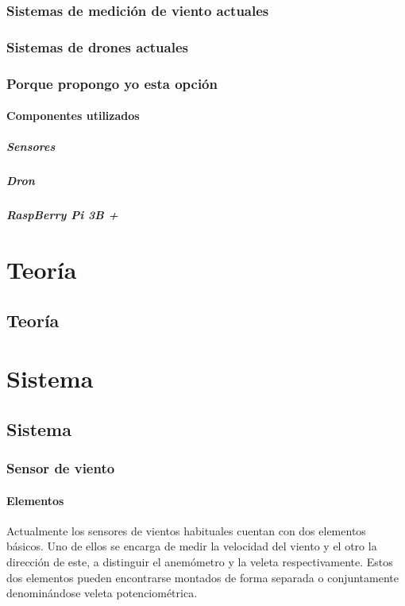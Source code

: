 \documentclass[spanish]{book}
\begin{document}
    \section{Sistemas de medición de viento actuales}
    \section{Sistemas de drones actuales}
    \section{Porque propongo yo esta opción}
        \subsection{Componentes utilizados}
        \subsubsection{Sensores}
        \subsubsection{Dron}
        \subsubsection{RaspBerry Pi 3B +}

\part{Teoría}
    \chapter{Teoría}
	
\part{Sistema}
    \chapter{Sistema}
        \section{Sensor de viento}
            \subsection{Elementos}
            Actualmente los sensores de vientos habituales cuentan con dos elementos básicos. Uno de ellos se encarga de medir la velocidad del viento y el otro la dirección de este, a distinguir el anemómetro y la veleta respectivamente. Estos dos elementos pueden encontrarse montados de forma separada o conjuntamente denominándose veleta potenciométrica. 
                     
\end{document}
